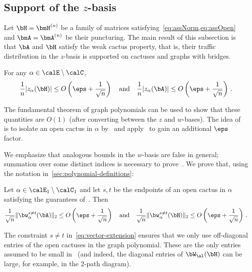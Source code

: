 \subsection{Support of the \texorpdfstring{$z$}{z}-basis}

Let $\bH=\bmH^{(n)}$ be a family of matrices
satisfying~\cref{eq:assNorm,eq:assOpen}
and $\bmA=\bmA^{(n)}$ be their puncturing.
The main result of this subsection is
that $\bA$ and $\bH$ satisfy the weak cactus
property, that is, their traffic 
distribution in the $z$-basis is supported on
cactuses and graphs with bridges.

\begin{proposition}
    \label{prop:Z-support}
    For any $\alpha\in \calE\setminus \calC$,
    \[
        \frac 1n |z_\alpha(\bH)|\le O\left(\eps + \frac 1 {\sqrt n}\right)\quad\text{and}\quad \frac 1n |z_\alpha(\bA)|\le O\left(\eps + \frac 1 {\sqrt n}\right)\,.
    \]
\end{proposition}

The fundamental theorem of graph polynomials can be used to show that these quantities are $O(1)$ (after converting between the $z$ and $w$-bases).
The idea of~ is
to isolate an open cactus in $\alpha$ by~
and apply~
to gain an additional $\eps$
factor.

We emphasize that analogous bounds in the
$w$-basis are false in general;
summation over some distinct indices
is necessary to prove~.
We prove that, using the notation in~\cref{sec:polynomial-definitions}:

\begin{lemma}    
    \label{prop:Z-support-vector}
    Let $\alpha\in\calE_1 \setminus \calC_1$ and
    let $s,t$ be the endpoints of an open
    cactus in $\alpha$ satisfying the guarantees
    of~. Then
    \begin{align}
        \frac 1 {\sqrt n} \|\bw_\alpha^{s\neq t}(\bA)\|_2 \le O\left(\eps + \frac 1 {\sqrt n}\right)\quad\text{and}\quad \frac 1 {\sqrt n} \|\bw_\alpha^{s\neq t}(\bH)\|_2\le O\left(\eps + \frac 1 {\sqrt n}\right)\,.\label{eq:vector-extension}
    \end{align}
\end{lemma}

The constraint
$s\neq t$ in~\cref{eq:vector-extension} ensures that we only use off-diagonal
entries of the open cactuses in the graph 
polynomial.
These are the only entries assumed to be small in~ (and indeed,
the diagonal entries of $\bW_\al(\bH)$ can be large,
for example, in the 2-path diagram).

